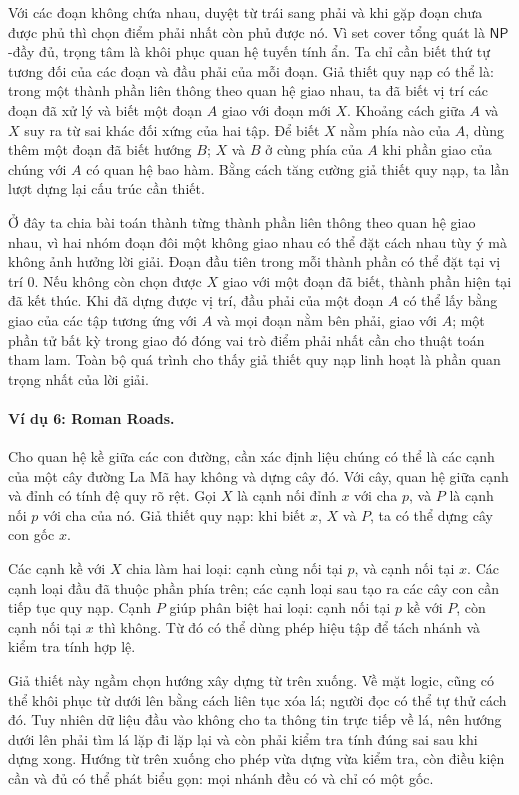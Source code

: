 \documentclass[11pt]{article}
\newcommand{\NP}{\mathsf{NP}}
\begin{document}
Với các đoạn không chứa nhau, duyệt từ trái sang phải và khi gặp đoạn chưa
được phủ thì chọn điểm phải nhất còn phủ được nó. Vì set cover tổng quát là
\(\NP\)-đầy đủ, trọng tâm là khôi phục quan hệ tuyến tính ẩn. Ta chỉ cần biết
thứ tự tương đối của các đoạn và đầu phải của mỗi đoạn. Giả thiết quy nạp có
thể là: trong một thành phần liên thông theo quan hệ giao nhau, ta đã biết vị
trí các đoạn đã xử lý và biết một đoạn \(A\) giao với đoạn mới \(X\). Khoảng
cách giữa \(A\) và \(X\) suy ra từ sai khác đối xứng của hai tập. Để biết
\(X\) nằm phía nào của \(A\), dùng thêm một đoạn đã biết hướng \(B\); \(X\)
và \(B\) ở cùng phía của \(A\) khi phần giao của chúng với \(A\) có quan hệ
bao hàm. Bằng cách tăng cường giả thiết quy nạp, ta lần lượt dựng lại cấu trúc
cần thiết.

Ở đây ta chia bài toán thành từng thành phần liên thông theo quan hệ giao
nhau, vì hai nhóm đoạn đôi một không giao nhau có thể đặt cách nhau tùy ý mà
không ảnh hưởng lời giải. Đoạn đầu tiên trong mỗi thành phần có thể đặt tại
vị trí \(0\). Nếu không còn chọn được \(X\) giao với một đoạn đã biết, thành
phần hiện tại đã kết thúc. Khi đã dựng được vị trí, đầu phải của một đoạn
\(A\) có thể lấy bằng giao của các tập tương ứng với \(A\) và mọi đoạn nằm
bên phải, giao với \(A\); một phần tử bất kỳ trong giao đó đóng vai trò điểm
phải nhất cần cho thuật toán tham lam. Toàn bộ quá trình cho thấy giả thiết
quy nạp linh hoạt là phần quan trọng nhất của lời giải.

\paragraph{Ví dụ 6: Roman Roads.}
Cho quan hệ kề giữa các con đường, cần xác định liệu chúng có thể là các cạnh
của một cây đường La Mã hay không và dựng cây đó. Với cây, quan hệ giữa cạnh
và đỉnh có tính đệ quy rõ rệt. Gọi \(X\) là cạnh nối đỉnh \(x\) với cha \(p\),
và \(P\) là cạnh nối \(p\) với cha của nó. Giả thiết quy nạp: khi biết \(x\),
\(X\) và \(P\), ta có thể dựng cây con gốc \(x\).

Các cạnh kề với \(X\) chia làm hai loại: cạnh cùng nối tại \(p\), và cạnh nối
tại \(x\). Các cạnh loại đầu đã thuộc phần phía trên; các cạnh loại sau tạo
ra các cây con cần tiếp tục quy nạp. Cạnh \(P\) giúp phân biệt hai loại: cạnh
nối tại \(p\) kề với \(P\), còn cạnh nối tại \(x\) thì không. Từ đó có thể
dùng phép hiệu tập để tách nhánh và kiểm tra tính hợp lệ.

Giả thiết này ngầm chọn hướng xây dựng từ trên xuống. Về mặt logic, cũng có
thể khôi phục từ dưới lên bằng cách liên tục xóa lá; người đọc có thể tự thử
cách đó. Tuy nhiên dữ liệu đầu vào không cho ta thông tin trực tiếp về lá, nên
hướng dưới lên phải tìm lá lặp đi lặp lại và còn phải kiểm tra tính đúng sai
sau khi dựng xong. Hướng từ trên xuống cho phép vừa dựng vừa kiểm tra, còn
điều kiện cần và đủ có thể phát biểu gọn: mọi nhánh đều có và chỉ có một gốc.
\end{document}
